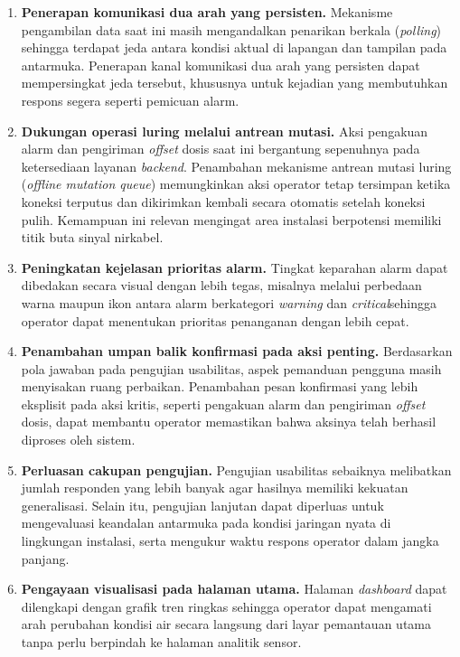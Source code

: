 \begin{enumerate}
    \item \textbf{Penerapan komunikasi dua arah yang persisten.} Mekanisme pengambilan data saat ini masih 
    mengandalkan penarikan berkala (\textit{polling}) sehingga terdapat jeda antara kondisi aktual di lapangan 
    dan tampilan pada antarmuka. Penerapan kanal komunikasi dua arah yang persisten dapat mempersingkat jeda 
    tersebut, khususnya untuk kejadian yang membutuhkan respons segera seperti pemicuan alarm.

    \item \textbf{Dukungan operasi luring melalui antrean mutasi.} Aksi pengakuan alarm dan pengiriman 
    \textit{offset} dosis saat ini bergantung sepenuhnya pada ketersediaan layanan \textit{backend}. Penambahan 
    mekanisme antrean mutasi luring (\textit{offline mutation queue}) memungkinkan aksi operator tetap tersimpan 
    ketika koneksi terputus dan dikirimkan kembali secara otomatis setelah koneksi pulih. Kemampuan ini relevan 
    mengingat area instalasi berpotensi memiliki titik buta sinyal nirkabel.

    \item \textbf{Peningkatan kejelasan prioritas alarm.} Tingkat keparahan alarm dapat dibedakan secara visual 
    dengan lebih tegas, misalnya melalui perbedaan warna maupun ikon antara alarm berkategori \textit{warning} 
    dan \textit{critical}sehingga operator dapat menentukan prioritas penanganan dengan lebih cepat.

    \item \textbf{Penambahan umpan balik konfirmasi pada aksi penting.} Berdasarkan pola jawaban pada pengujian 
    usabilitas, aspek pemanduan pengguna masih menyisakan ruang perbaikan. Penambahan pesan konfirmasi yang lebih 
    eksplisit pada aksi kritis, seperti pengakuan alarm dan pengiriman \textit{offset} dosis, dapat membantu 
    operator memastikan bahwa aksinya telah berhasil diproses oleh sistem.

    \item \textbf{Perluasan cakupan pengujian.} Pengujian usabilitas sebaiknya melibatkan jumlah responden yang 
    lebih banyak agar hasilnya memiliki kekuatan generalisasi. Selain itu, pengujian lanjutan dapat diperluas 
    untuk mengevaluasi keandalan antarmuka pada kondisi jaringan nyata di lingkungan instalasi, serta mengukur 
    waktu respons operator dalam jangka panjang.

    \item \textbf{Pengayaan visualisasi pada halaman utama.} Halaman \textit{dashboard} dapat dilengkapi dengan 
    grafik tren ringkas sehingga operator dapat mengamati arah perubahan kondisi air secara langsung dari layar 
    pemantauan utama tanpa perlu berpindah ke halaman analitik sensor.
\end{enumerate}